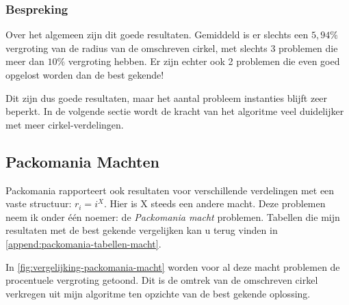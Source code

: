 \documentclass[12pt,a4paper,oneside]{book}
\begin{document}
\subsubsection{Bespreking}

Over het algemeen zijn dit goede resultaten.
Gemiddeld is er slechts een $5,94\%$ vergroting van de radius van de omschreven cirkel, met slechts 3 problemen die meer dan $10\%$ vergroting hebben.
Er zijn echter ook 2 problemen die even goed opgelost worden dan de best gekende!

Dit zijn dus goede resultaten, maar het aantal probleem instanties blijft zeer beperkt.
In de volgende sectie wordt de kracht van het algoritme veel duidelijker met meer cirkel-verdelingen.

\subsection{Packomania Machten}

Packomania rapporteert ook resultaten voor verschillende verdelingen met een vaste structuur: $r_i=i^X$.
Hier is X steeds een andere macht.
Deze problemen neem ik onder één noemer: de \textit{Packomania macht} problemen.
Tabellen die mijn resultaten met de best gekende vergelijken kan u terug vinden in \autoref{append:packomania-tabellen-macht}.

In \autoref{fig:vergelijking-packomania-macht} worden voor al deze macht problemen de procentuele vergroting getoond.
Dit is de omtrek van de omschreven cirkel verkregen uit mijn algoritme ten opzichte van de best gekende oplossing.
\end{document}
